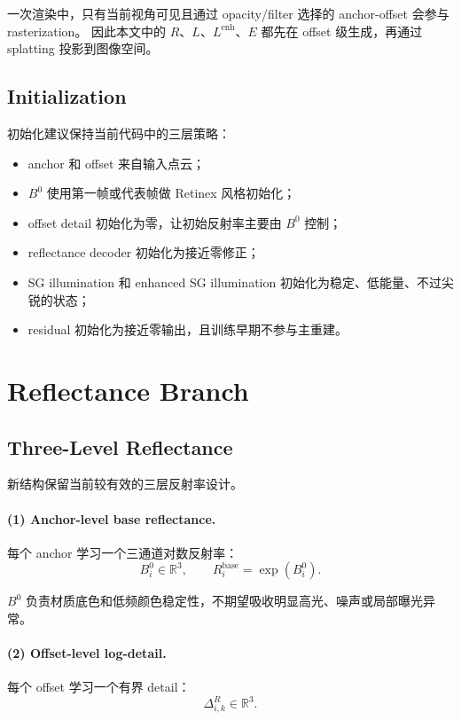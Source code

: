 \documentclass[11pt]{article}
\begin{document}
一次渲染中，只有当前视角可见且通过 opacity/filter 选择的 anchor-offset 会参与 rasterization。
因此本文中的 $R$、$L$、$L^{\text{enh}}$、$E$ 都先在 offset 级生成，再通过 splatting 投影到图像空间。

\subsection{Initialization}

初始化建议保持当前代码中的三层策略：
\begin{itemize}[leftmargin=1.5em]
    \item anchor 和 offset 来自输入点云；
    \item $B^0$ 使用第一帧或代表帧做 Retinex 风格初始化；
    \item offset detail 初始化为零，让初始反射率主要由 $B^0$ 控制；
    \item reflectance decoder 初始化为接近零修正；
    \item SG illumination 和 enhanced SG illumination 初始化为稳定、低能量、不过尖锐的状态；
    \item residual 初始化为接近零输出，且训练早期不参与主重建。
\end{itemize}

\section{Reflectance Branch}

\subsection{Three-Level Reflectance}

新结构保留当前较有效的三层反射率设计。

\paragraph{(1) Anchor-level base reflectance.}
每个 anchor 学习一个三通道对数反射率：
\begin{equation}
    B_i^0 \in \mathbb{R}^3,
    \qquad
    R_i^{\text{base}} = \exp(B_i^0).
\end{equation}

$B^0$ 负责材质底色和低频颜色稳定性，不期望吸收明显高光、噪声或局部曝光异常。

\paragraph{(2) Offset-level log-detail.}
每个 offset 学习一个有界 detail：
\begin{equation}
    \Delta^R_{i,k} \in \mathbb{R}^3.
\end{equation}
\end{document}
